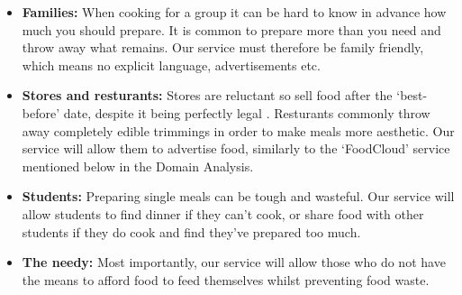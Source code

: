 \documentclass[12pt]{article}
\begin{document}
\begin{itemize}
	\item \textbf{Families:} When cooking for a group it can be hard to know in advance how much you should prepare.
			It is common to prepare more than you need and throw away what remains.
			Our service must therefore be family friendly, which means no explicit language, advertisements etc.
	\item \textbf{Stores and resturants:} Stores are reluctant so sell food after the `best-before' date, despite it being perfectly legal \cite{govuk}.
			Resturants commonly throw away completely edible trimmings in order to make meals more aesthetic. Our service will allow them to advertise food,
			similarly to the `FoodCloud' service mentioned below in the Domain Analysis.
	\item \textbf{Students:} Preparing single meals can be tough and wasteful. Our service will allow students to find dinner if they can't cook, or share food
			with other students if they do cook and find they've prepared too much.
	\item \textbf{The needy:} Most importantly, our service will allow those who do not have the means to afford food to feed themselves whilst preventing food waste.
\end{itemize}
\end{document}
